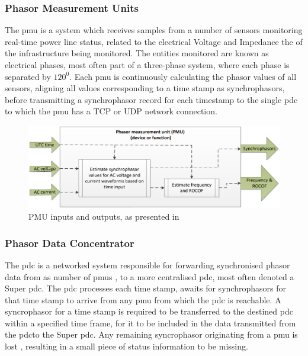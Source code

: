 
\subsubsection{Phasor Measurement Units}
The \acrfull{pmu} is a system which receives samples from a number of sensors monitoring  real-time power line status, related to the electrical Voltage and Impedance the of the infrastructure being monitored. 
The entities monitored are known as electrical phases, most often part of a three-phase system, where each phase is separated by $120^0$.
Each \acrshort{pmu} is continuously calculating the phasor values of all sensors, aligning all values corresponding to a time stamp as synchrophasors, before transmitting a synchrophasor record for each timestamp to the single \acrfull{pdc} to which the \acrshort{pmu} has a  TCP or UDP network connection. 





\begin{figure}%
\includegraphics[width=\linewidth]{figures/PMU-in-out.eps}
\caption[PMU inputs and outputs]{PMU inputs and outputs, as presented in \Cite[p.12]{iec2018measuring}
}
\label{fig:PMU-in-out}
\end{figure}

\subsubsection{Phasor Data Concentrator}

The \acrfull{pdc} is a networked system responsible for forwarding synchronised phasor data from as number of \acrshort{pmu}s 
, to a more centralised \acrshort{pdc}, most often denoted a Super \acrshort{pdc}. The \acrshort{pdc} processes each time stamp, awaits for synchrophasors for that time stamp to arrive from any \acrshort{pmu} from which the \acrshort{pdc} is reachable. A syncrophasor for a time stamp is required to be transferred to the destined \acrshort{pdc} within a specified time frame, for it to be included in the data transmitted from the \acrshort{pdc}to the Super \acrshort{pdc}. Any remaining syncrophasor originating from a \acrshort{pmu} is lost
, resulting in a small piece of status information to be missing. 


